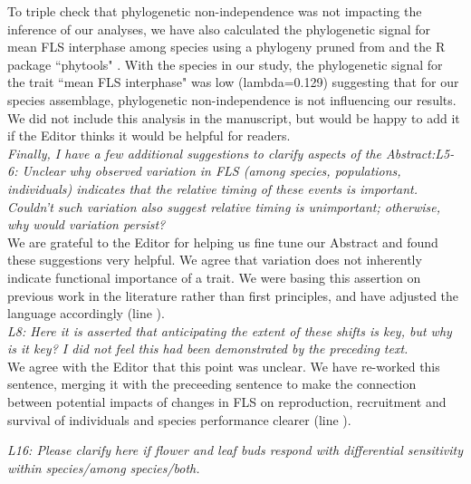 \documentclass[11pt]{article}
\begin{document}
\noindent To triple check that phylogenetic non-independence was not impacting the inference of our analyses, we have also calculated the phylogenetic signal for mean FLS interphase among species using a phylogeny pruned from \citet{Zanne2013} and the R package ``phytools" \citep{Revell2012}. With the species in our study, the phylogenetic signal for the trait ``mean FLS interphase" was low (lambda=0.129) suggesting that for our species assemblage, phylogenetic non-independence is not influencing our results. We did not include this analysis in the manuscript, but would be happy to add it if the Editor thinks it would be helpful for readers.\\

\emph{Finally, I have a few additional suggestions to clarify aspects of the Abstract:L5-6: Unclear why observed variation in FLS (among species, populations, individuals) indicates that the relative timing of these events is important. Couldn't such variation also suggest relative timing is unimportant; otherwise, why would variation persist?}\\

\noident We are grateful to the Editor for helping us fine tune our Abstract and found these suggestions very helpful. We agree that variation does not inherently indicate functional importance of a trait. We were basing this assertion on previous work in the literature rather than first principles, and have adjusted the language accordingly (line ).\\ %

\emph{L8: Here it is asserted that anticipating the extent of these shifts is key, but why is it key? I did not feel this had been demonstrated by the preceding text.}\\

\noindent We agree with the Editor that this point was unclear. We have re-worked this sentence, merging it with the preceeding sentence to make the connection between potential impacts of changes in FLS on reproduction, recruitment and survival of individuals and species performance clearer (line ). %

\emph{L16: Please clarify here if flower and leaf buds respond with differential sensitivity within species/among species/both.}\\
\end{document}
